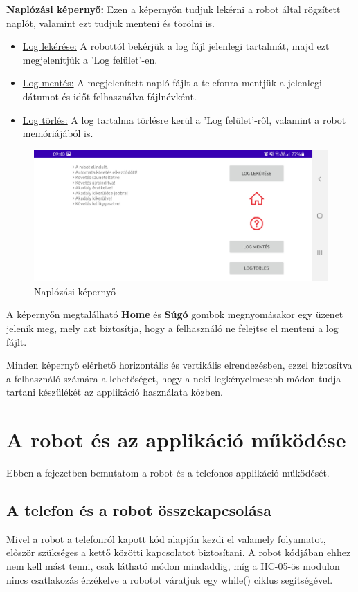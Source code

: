 \documentclass[]{thesis-ekf}
\theoremstyle{definition}
\begin{document}
\textbf{Naplózási képernyő:} Ezen a képernyőn tudjuk lekérni a robot által rögzített naplót, valamint ezt tudjuk menteni és törölni is.
\begin{itemize}
	\item \underline{Log lekérése:} A robottól bekérjük a log fájl jelenlegi tartalmát, majd ezt megjelenítjük a 'Log felület'-en.
	\item \underline{Log mentés:} A megjelenített napló fájlt a telefonra mentjük a jelenlegi dátumot és időt felhasználva fájlnévként.
	\item \underline{Log törlés:} A log tartalma törlésre kerül a 'Log felület'-ről, valamint a robot memóriájából is.
\end{itemize}
\begin{figure}[h]
	\centering
	\includegraphics[width=\columnwidth]{images/app_screen/log_screen}
	\caption{Naplózási képernyő}
	\label{log_screen}
\end{figure}

A képernyőn megtalálható \textbf{Home} és \textbf{Súgó} gombok megnyomásakor egy üzenet jelenik meg, mely azt biztosítja, hogy a felhasználó ne felejtse el menteni a log fájlt.

Minden képernyő elérhető horizontális és vertikális elrendezésben, ezzel biztosítva a felhasználó számára a lehetőséget, hogy a neki legkényelmesebb módon tudja tartani készülékét az applikáció használata közben.
\chapter{A robot és az applikáció működése}\label{fejezet_5}
Ebben a fejezetben bemutatom a robot és a telefonos applikáció működését.
\section{A telefon és a robot összekapcsolása}
Mivel a robot a telefonról kapott kód alapján kezdi el valamely folyamatot, először szükséges a kettő közötti kapcsolatot biztosítani. A robot kódjában ehhez nem kell mást tenni, csak  látható módon mindaddig, míg a HC-05-ös modulon nincs csatlakozás érzékelve a robotot váratjuk egy while() ciklus segítségével.

\end{document}
